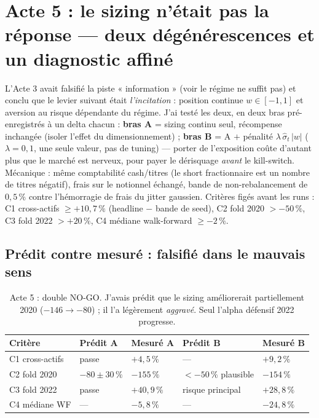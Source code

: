 \documentclass[11pt,a4paper]{article}
\newcommand{\ok}[1]{\textcolor{okgreen}{#1}}
\newcommand{\ko}[1]{\textcolor{kored}{#1}}
\begin{document}
\section{Acte 5 : le sizing n'était pas la réponse --- deux dégénérescences
et un diagnostic affiné}
\label{sec:continuous}

L'Acte 3 avait falsifié la piste « information » (voir le régime ne suffit pas) et
conclu que le levier suivant était \emph{l'incitation} : position continue
$w \in [-1, 1]$ et aversion au risque dépendante du régime. J'ai testé les deux,
en deux bras pré-enregistrés à un delta chacun : \textbf{bras A} = sizing continu
seul, récompense inchangée (isoler l'effet du dimensionnement) ; \textbf{bras B} =
A $+$ pénalité $\lambda\,\hat\sigma_t\,|w|$ ($\lambda = 0{,}1$, une seule valeur,
pas de tuning) --- porter de l'exposition coûte d'autant plus que le marché est
nerveux, pour payer le dérisquage \emph{avant} le kill-switch. Mécanique :
même comptabilité cash/titres (le short fractionnaire est un nombre de titres
négatif), frais sur le notionnel échangé, bande de non-rebalancement de
$0{,}5\,\%$ contre l'hémorragie de frais du jitter gaussien. Critères figés avant
les runs : C1 cross-actifs $\geq +10{,}7\,\%$ (headline $-$ bande de seed), C2
fold 2020 $> -50\,\%$, C3 fold 2022 $> +20\,\%$, C4 médiane walk-forward
$\geq -2\,\%$.

\subsection{Prédit contre mesuré : falsifié dans le mauvais sens}

\begin{table}[H]
\centering\small
\begin{tabular}{@{}lllll@{}}
\toprule
\textbf{Critère} & \textbf{Prédit A} & \textbf{Mesuré A} & \textbf{Prédit B} & \textbf{Mesuré B} \\
\midrule
C1 cross-actifs & passe & \ko{$+4{,}5\,\%$} & --- & \ko{$+9{,}2\,\%$} \\
C2 fold 2020    & $-80 \pm 30\,\%$ & \ko{$-155\,\%$} & $< -50\,\%$ plausible & \ko{$-154\,\%$} \\
C3 fold 2022    & passe & \ok{$+40{,}9\,\%$} & risque principal & \ok{$+28{,}8\,\%$} \\
C4 médiane WF   & --- & \ko{$-5{,}8\,\%$} & --- & \ko{$-24{,}8\,\%$} \\
\bottomrule
\end{tabular}
\caption{Acte 5 : double NO-GO. J'avais prédit que le sizing améliorerait
partiellement 2020 ($-146 \to -80$) ; il l'a légèrement \emph{aggravé}. Seul
l'alpha défensif 2022 progresse.}
\label{tab:continuous}
\end{table}
\end{document}
